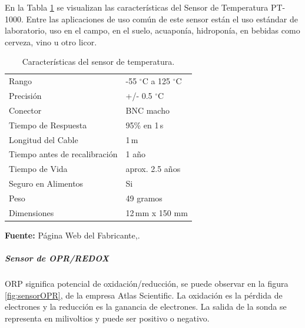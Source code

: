 En la Tabla \ref{tab:caract_temp} se visualizan las características del Sensor de Temperatura PT-1000.
Entre las aplicaciones de uso común de este sensor están el uso est\'andar de laboratorio, uso en el campo, en el suelo, acuapon\'ia, hidroponía, en bebidas como cerveza, vino u otro licor.

\begin{table}[H]
\protect\caption[Características del sensor de temperatura]{Características del sensor de temperatura.}
\label{tab:caract_temp}
\begin{center}
\begin{tabular}{l l}
\hline
Rango    &  -55 $^{\circ}$C a 125 $^{\circ}$C\\
Precisión      &  +/- 0.5 $^{\circ}$C \\
Conector &  BNC macho\\
Tiempo de Respuesta   &  95\% en 1 s\\
Longitud del Cable	& 1 m\\
Tiempo antes de recalibraci\'on	& 1 año\\
Tiempo de Vida	& aprox. 2.5 años\\
Seguro en Alimentos & Si\\
Peso & 49 gramos\\
Dimensiones & 12 mm x 150 mm\\
\hline
\end{tabular}
\vspace{5mm}
\newline
\hfill
\textbf{Fuente: }P\'agina Web del Fabricante,\cite{ezotemp}. 
\end{center}
\end{table} 

\subparagraph{Sensor de OPR/REDOX}
ORP significa potencial de oxidación/reducci\'on, se puede observar en la figura \ref{fig:sensorOPR}, de la empresa Atlas Scientific. La oxidación es la pérdida de electrones y la reducción es la ganancia de electrones. La salida de la sonda se representa en milivoltios y puede ser positivo o negativo.

